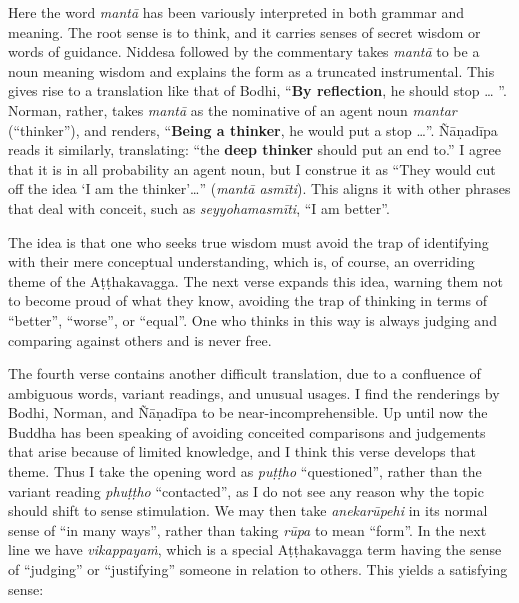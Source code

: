 \documentclass[12pt,openany]{book}%
\begin{document}
Here the word \textit{\textsanskrit{mantā}} has been variously interpreted in both grammar and meaning. The root sense is to think, and it carries senses of secret wisdom or words of guidance. Niddesa followed by the commentary takes \textit{\textsanskrit{mantā}} to be a noun meaning wisdom and explains the form as a truncated instrumental. This gives rise to a translation like that of Bodhi, “\textbf{By reflection}, he should stop … ”. Norman, rather, takes \textit{\textsanskrit{mantā}} as the nominative of an agent noun \textit{mantar} (“thinker”), and renders, “\textbf{Being a thinker}, he would put a stop …”. \textsanskrit{Ñāṇadīpa} reads it similarly, translating: “the \textbf{deep thinker} should put an end to.” I agree that it is in all probability an agent noun, but I construe it as “They would cut off the idea ‘I am the thinker’…” (\textit{\textsanskrit{mantā} \textsanskrit{asmīti}}). This aligns it with other phrases that deal with conceit, such as \textit{\textsanskrit{seyyohamasmīti}}, “I am better”.

The idea is that one who seeks true wisdom must avoid the trap of identifying with their mere conceptual understanding, which is, of course, an overriding theme of the \textsanskrit{Aṭṭhakavagga}. The next verse expands this idea, warning them not to become proud of what they know, avoiding the trap of thinking in terms of “better”, “worse”, or “equal”. One who thinks in this way is always judging and comparing against others and is never free.

The fourth verse contains another difficult translation, due to a confluence of ambiguous words, variant readings, and unusual usages. I find the renderings by Bodhi, Norman, and \textsanskrit{Ñāṇadīpa} to be near-incomprehensible. Up until now the Buddha has been speaking of avoiding conceited comparisons and judgements that arise because of limited knowledge, and I think this verse develops that theme. Thus I take the opening word as \textit{\textsanskrit{puṭṭho}} “questioned”, rather than the variant reading \textit{\textsanskrit{phuṭṭho}} “contacted”, as I do not see any reason why the topic should shift to sense stimulation. We may then take \textit{\textsanskrit{anekarūpehi}} in its normal sense of “in many ways”, rather than taking \textit{\textsanskrit{rūpa}} to mean “form”. In the next line we have \textit{\textsanskrit{vikappayaṁ}}, which is a special \textsanskrit{Aṭṭhakavagga} term having the sense of “judging” or “justifying” someone in relation to others. This yields a satisfying sense:
\end{document}
